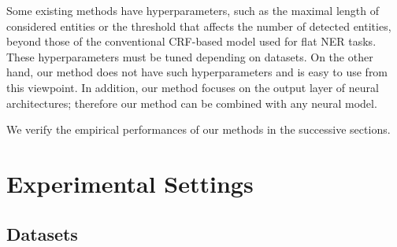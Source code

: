 \documentclass[11pt,a4paper]{article}
\begin{document}
Some existing methods have hyperparameters, such as the maximal length of considered entities or the threshold that affects the number of detected entities, beyond those of the conventional CRF-based model used for flat NER tasks.
These hyperparameters must be tuned depending on datasets. 
On the other hand, our method does not have such hyperparameters and is easy to use from this viewpoint.
In addition, our method focuses on the output layer of neural architectures; therefore our method can be combined with any neural model.

We verify the empirical performances of our methods in the successive sections.

\section{Experimental Settings}

\subsection{Datasets}

\begin{table*}[t!]
\centering
\small
{}
\caption{Statistics of the datasets used in the experiments. Note that in ACE-2005, sentences are not originally split. We report the numbers of sentences based on the preprocessing with the Stanford CoreNLP~\cite{manning-etal-2014-stanford}.}\label{tab:stats-datasets}
\end{table*}
\end{document}
